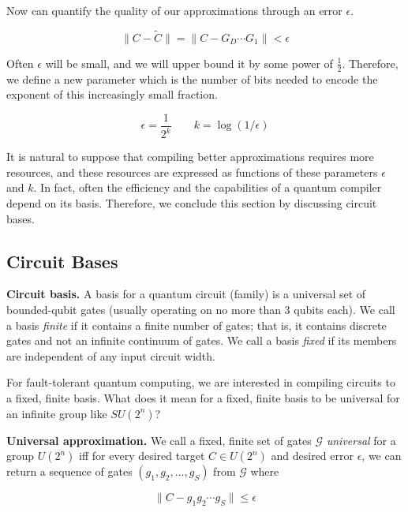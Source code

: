 Now can quantify the quality of our approximations through an
error $\epsilon$.

\begin{equation}
\| C - \tilde{C}\| = \| C -  G_D\cdots G_1 \| < \epsilon
\end{equation}

Often $\epsilon$ will be small, and we will upper bound it by some
power of $\frac{1}{2}$. Therefore, we define a
new parameter which is the number of bits needed to encode the exponent
of this increasingly small fraction.

\begin{equation}
\epsilon = \frac{1}{2^k} \qquad
k = \log(1/\epsilon)
\end{equation}

It is natural to suppose that compiling better approximations requires
more resources, and these resources are expressed as functions of these
parameters $\epsilon$ and $k$.
In fact, often the efficiency and the
capabilities of a quantum
compiler depend on its basis. Therefore, we conclude this section by
discussing circuit bases.

\subsection{Circuit Bases}
\label{subsec:qcompile-bases}

\begin{definition}{\textbf{Circuit basis.}}
A basis for a quantum circuit (family) is a universal set of
bounded-qubit gates (usually operating on no more than 3 qubits each).
We call a basis \emph{finite} if it contains a finite
number of gates; that is, it contains discrete gates and not an infinite
continuum of gates. We call a basis \emph{fixed} if its members are independent
of any input circuit width.
\end{definition}

For fault-tolerant quantum computing, we are interested in compiling
circuits to a fixed, finite basis. What does it mean for a fixed, finite
basis to be universal for an infinite group like $SU(2^n)$?

\begin{definition}{\textbf{Universal approximation.}}
We call a fixed, finite set of gates $\mathcal{G}$ \emph{universal} for
a group $U(2^n)$ iff for every desired target $C \in U(2^n)$ and
desired error $\epsilon$, we can return a
sequence of gates $(g_1,g_2,\ldots,g_S)$ from $\mathcal{G}$ where

\begin{equation}
\| C - g_1 g_2 \cdots g_S \| \le \epsilon
\end{equation}

\end{definition}

